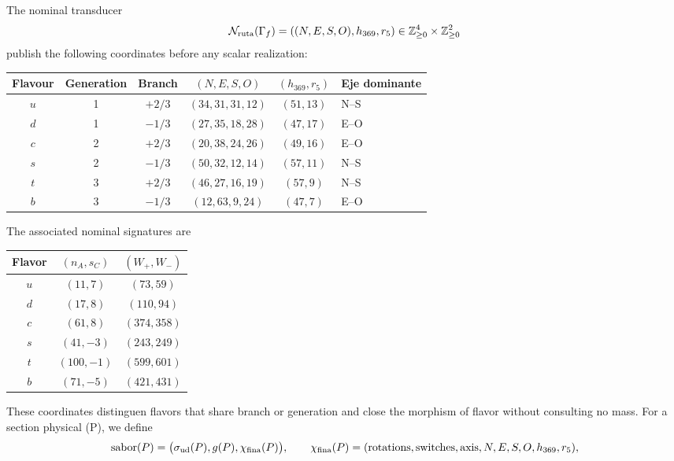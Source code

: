 The nominal transducer
\begin{equation}
 \mathcal N_{\rm ruta}(\Gamma_f)
 =((N,E,S,O),h_{369},r_5)
 \in\mathbb Z_{\ge0}^{4}\times\mathbb Z_{\ge0}^{2}
 \label{eq:transductor-nominal-quark-rev2}
\end{equation}
publish the following coordinates before any scalar realization:
\begin{center}
\small
\begin{tabularx}{0.96\textwidth}{@{}c c c c c X@{}}
\toprule
\textbf{Flavour} & \textbf{Generation} & \textbf{Branch} &
\textbf{\((N,E,S,O)\)} & \textbf{\((h_{369},r_5)\)} &
\textbf{Eje dominante}\\
\midrule
\(u\)&1&\(+2/3\)&\((34,31,31,12)\)&\((51,13)\)&N--S\\
\(d\)&1&\(-1/3\)&\((27,35,18,28)\)&\((47,17)\)&E--O\\
\(c\)&2&\(+2/3\)&\((20,38,24,26)\)&\((49,16)\)&E--O\\
\(s\)&2&\(-1/3\)&\((50,32,12,14)\)&\((57,11)\)&N--S\\
\(t\)&3&\(+2/3\)&\((46,27,16,19)\)&\((57,9)\)&N--S\\
\(b\)&3&\(-1/3\)&\((12,63,9,24)\)&\((47,7)\)&E--O\\
\bottomrule
\end{tabularx}
\end{center}
The associated nominal signatures are
\begin{center}
\small
\begin{tabular}{@{}c c c@{}}
\toprule
\textbf{Flavor} & \textbf{\((n_A,s_C)\)} & \textbf{\((W_+,W_-)\)}\\
\midrule
\(u\)&\((11,7)\)&\((73,59)\)\\
\(d\)&\((17,8)\)&\((110,94)\)\\
\(c\)&\((61,8)\)&\((374,358)\)\\
\(s\)&\((41,-3)\)&\((243,249)\)\\
\(t\)&\((100,-1)\)&\((599,601)\)\\
\(b\)&\((71,-5)\)&\((421,431)\)\\
\bottomrule
\end{tabular}
\end{center}
These coordinates distinguen flavors that share branch or generation and close
the morphism of flavor without consulting no mass. For a section physical (P),
we define
\begin{equation}
 \operatorname{sabor}(P)
 =\bigl(\sigma_{\rm ud}(P),g(P),\chi_{\rm fina}(P)\bigr),
 \qquad
 \chi_{\rm fina}(P)
 =(\text{rotations},\text{switches},\text{axis},N,E,S,O,h_{369},r_5),
 \label{eq:morfismo-sabor-ruta-cerrado-rev2}
\end{equation}
